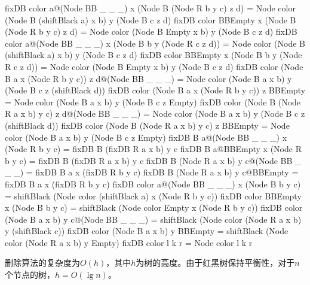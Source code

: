 \documentclass[b5paper]{ctexart}
\begin{document}
\begin{Haskell}
fixDB color a@(Node BB _ _ _) x (Node B (Node R b y c) z d)
      = Node color (Node B (shiftBlack a) x b) y (Node B c z d)
fixDB color BBEmpty x (Node B (Node R b y c) z d)
      = Node color (Node B Empty x b) y (Node B c z d)
fixDB color a@(Node BB _ _ _) x (Node B b y (Node R c z d))
      = Node color (Node B (shiftBlack a) x b) y (Node B c z d)
fixDB color BBEmpty x (Node B b y (Node R c z d))
      = Node color (Node B Empty x b) y (Node B c z d)
fixDB color (Node B a x (Node R b y c)) z d@(Node BB _ _ _)
      = Node color (Node B a x b) y (Node B c z (shiftBlack d))
fixDB color (Node B a x (Node R b y c)) z BBEmpty
      = Node color (Node B a x b) y (Node B c z Empty)
fixDB color (Node B (Node R a x b) y c) z d@(Node BB _ _ _)
      = Node color (Node B a x b) y (Node B c z (shiftBlack d))
fixDB color (Node B (Node R a x b) y c) z BBEmpty
      = Node color (Node B a x b) y (Node B c z Empty)
fixDB B a@(Node BB _ _ _) x (Node R b y c)
      = fixDB B (fixDB R a x b) y c
fixDB B a@BBEmpty x (Node R b y c)
      = fixDB B (fixDB R a x b) y c
fixDB B (Node R a x b) y c@(Node BB _ _ _)
      = fixDB B a x (fixDB R b y c)
fixDB B (Node R a x b) y c@BBEmpty
      = fixDB B a x (fixDB R b y c)
fixDB color a@(Node BB _ _ _) x (Node B b y c)
      = shiftBlack (Node color (shiftBlack a) x (Node R b y c))
fixDB color BBEmpty x (Node B b y c)
      = shiftBlack (Node color Empty x (Node R b y c))
fixDB color (Node B a x b) y c@(Node BB _ _ _)
      = shiftBlack (Node color (Node R a x b) y (shiftBlack c))
fixDB color (Node B a x b) y BBEmpty
      = shiftBlack (Node color (Node R a x b) y Empty)
fixDB color l k r = Node color l k r
\end{Haskell}

删除算法的复杂度为$O(h)$，其中$h$为树的高度。由于红黑树保持平衡性，对于$n$个节点的树，$h = O(\lg n)$。

\begin{Exercise}\label{ex:mark-rebuild}
\end{Exercise}
\end{document}
